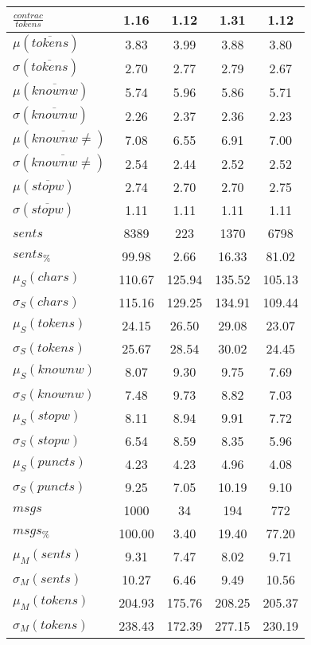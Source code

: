 \begin{table}[h!]
\begin{center}
\begin{tabular}{| l || c | c | c | c |}
$\frac{contrac}{tokens}$ & 1.16  & 1.12  & 1.31  & 1.12 \\\hline\hline
$\mu(\overline{tokens})$ & 3.83  & 3.99  & 3.88  & 3.80 \\
$\sigma(\overline{tokens})$ & 2.70  & 2.77  & 2.79  & 2.67 \\\hline
$\mu(\overline{knownw})$ & 5.74  & 5.96  & 5.86  & 5.71 \\
$\sigma(\overline{knownw})$ & 2.26  & 2.37  & 2.36  & 2.23 \\\hline
$\mu(\overline{knownw \neq})$ & 7.08  & 6.55  & 6.91  & 7.00 \\
$\sigma(\overline{knownw \neq})$ & 2.54  & 2.44  & 2.52  & 2.52 \\\hline
$\mu(\overline{stopw})$ & 2.74  & 2.70  & 2.70  & 2.75 \\
$\sigma(\overline{stopw})$ & 1.11  & 1.11  & 1.11  & 1.11 \\\hline\hline
$sents$ & 8389  & 223  & 1370  & 6798 \\
$sents_{\%}$ & 99.98  & 2.66  & 16.33  & 81.02 \\\hline
$\mu_S(chars)$ & 110.67  & 125.94  & 135.52  & 105.13 \\
$\sigma_S(chars)$ & 115.16  & 129.25  & 134.91  & 109.44 \\\hline
$\mu_S(tokens)$ & 24.15  & 26.50  & 29.08  & 23.07 \\
$\sigma_S(tokens)$ & 25.67  & 28.54  & 30.02  & 24.45 \\\hline
$\mu_S(knownw)$ & 8.07  & 9.30  & 9.75  & 7.69 \\
$\sigma_S(knownw)$ & 7.48  & 9.73  & 8.82  & 7.03 \\\hline
$\mu_S(stopw)$ & 8.11  & 8.94  & 9.91  & 7.72 \\
$\sigma_S(stopw)$ & 6.54  & 8.59  & 8.35  & 5.96 \\\hline
$\mu_S(puncts)$ & 4.23  & 4.23  & 4.96  & 4.08 \\
$\sigma_S(puncts)$ & 9.25  & 7.05  & 10.19  & 9.10 \\\hline\hline
$msgs$ & 1000  & 34  & 194  & 772 \\
$msgs_{\%}$ & 100.00  & 3.40  & 19.40  & 77.20 \\\hline
$\mu_M(sents)$ & 9.31  & 7.47  & 8.02  & 9.71 \\
$\sigma_M(sents)$ & 10.27  & 6.46  & 9.49  & 10.56 \\\hline
$\mu_M(tokens)$ & 204.93  & 175.76  & 208.25  & 205.37 \\
$\sigma_M(tokens)$ & 238.43  & 172.39  & 277.15  & 230.19 \\\hline

\end{tabular}
\end{center}
\end{table}
